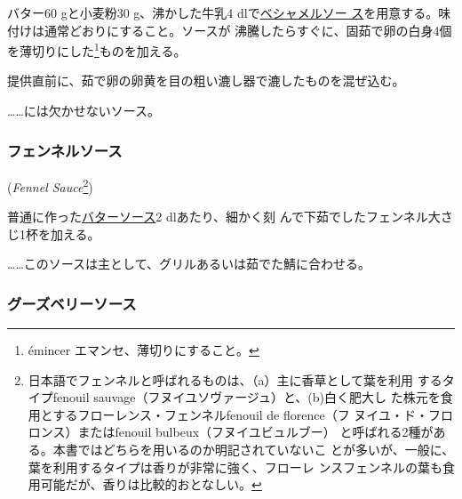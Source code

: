\begin{recette}
バター60 gと小麦粉30 g、沸かした牛乳4
dlで\protect\hyperlink{sauce-bechamel}{ベシャメルソー
ス}を用意する。味付けは通常どおりにすること。ソースが
沸騰したらすぐに、固茹で卵の白身4個を薄切りにした\footnote{émincer
  エマンセ、薄切りにすること。}ものを加える。

提供直前に、茹で卵の卵黄を目の粗い漉し器で漉したものを混ぜ込む。

\ldots{}\ldots{}には欠かせないソース。

\maeaki

\hypertarget{fennel-sauce}{%
\subsubsection{フェンネルソース}\label{fennel-sauce}}

\hspace{1em}(\emph{Fennel Sauce}\footnote{日本語でフェンネルと呼ばれるものは、（a）主に香草として葉を利用
  するタイプfenouil sauvage（フヌイユソヴァージュ）と、(b)白く肥大し
  た株元を食用とするフローレンス・フェンネルfenouil de florence（フ
  ヌイユ・ド・フロロンス）またはfenouil bulbeux（フヌイユビュルブー）
  と呼ばれる2種がある。本書ではどちらを用いるのか明記されていないこ
  とが多いが、一般に、葉を利用するタイプは香りが非常に強く、フローレ
  ンスフェンネルの葉も食用可能だが、香りは比較的おとなしい。})


普通に作った\protect\hyperlink{butter-sauce}{バターソース}2\undemi{}
dlあたり、細かく刻 んで下茹でしたフェンネル大さじ1杯を加える。

\ldots{}\ldots{}このソースは主として、グリルあるいは茹でた鯖に合わせる。

\maeaki

\hypertarget{gooseberry-sauce}{%
\subsubsection{グーズベリーソース}\label{gooseberry-sauce}}


\end{recette}
